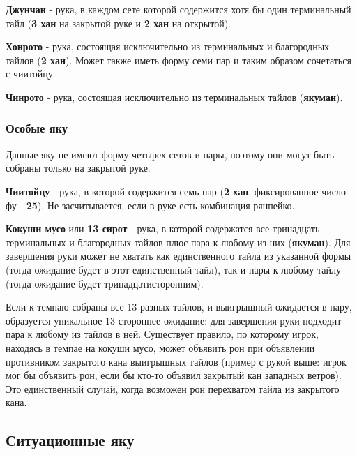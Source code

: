  \hfill {}

\textbf{Джунчан} - рука, в каждом сете которой содержится хотя бы один терминальный тайл (\textbf{3 хан} на закрытой руке и \textbf{2 хан} на открытой).

 \hfill {}

\textbf{Хонрото} - рука, состоящая исключительно из терминальных и благородных тайлов (\textbf{2 хан}). Может также иметь форму семи пар и таким образом сочетаться с чиитойцу.

 \hfill {}

\textbf{Чинрото} - рука, состоящая исключительно из терминальных тайлов (\textbf{якуман}).

 \hfill {}

\subsubsection{Особые яку}

Данные яку не имеют форму четырех сетов и пары, поэтому они могут быть собраны только на закрытой руке.

\textbf{Чиитойцу} - рука, в которой содержится семь пар (\textbf{2 хан}, фиксированное число фу - \textbf{25}). Не засчитывается, если в руке есть комбинация рянпейко.


\textbf{Кокуши мусо} или \textbf{13 сирот} - рука, в которой содержатся все тринадцать терминальных и благородных тайлов плюс пара к любому из них (\textbf{якуман}). Для завершения руки может не хватать как единственного тайла из указанной формы (тогда ожидание будет в этот единственный тайл), так и пары к любому тайлу (тогда ожидание будет тринадцатисторонним).

Если к темпаю собраны все 13 разных тайлов, и выигрышный ожидается в пару, образуется уникальное 13-стороннее ожидание: для завершения руки подходит пара к любому из тайлов в ней.  Существует правило, по которому игрок, находясь в темпае на кокуши мусо, может объявить рон при объявлении противником закрытого кана выигрышных тайлов (пример с рукой выше: игрок мог бы объявить рон, если бы кто-то объявил закрытый кан западных ветров). Это единственный случай, когда возможен рон перехватом тайла из закрытого кана.


\subsection{Ситуационные яку}

